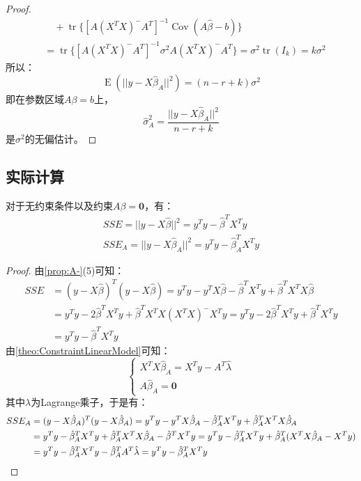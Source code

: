 \begin{proof}
\begin{align*}
		&\quad+\operatorname{tr}\{[A(X^TX)^-A^T]^{-1}\operatorname{Cov}(A\hat{\beta}-b)\} \\
		&=\operatorname{tr}\{[A(X^TX)^-A^T]^{-1}\sigma^2A(X^TX)^-A^T\}=\sigma^2\operatorname{tr}(I_k)=k\sigma^2
	\end{align*}
	所以：
	\begin{equation*}
		\operatorname{E}(||y-X\hat{\beta}_A||^2)=(n-r+k)\sigma^2
	\end{equation*}
	即在参数区域$A\beta=b$上，
	\begin{equation*}
		\hat{\sigma}_A^2=\frac{||y-X\hat{\beta}_A||^2}{n-r+k}
	\end{equation*}
	是$\sigma^2$的无偏估计。
\end{proof}

\subsection{实际计算}
\begin{theorem}
	对于无约束条件以及约束$A\beta=\mathbf{0}$，有：
	\begin{gather*}
		SSE=||y-X\hat{\beta}||^2=y^Ty-\hat{\beta}^TX^Ty \\
		SSE_A=||y-X\hat{\beta}_A||^2=y^Ty-\hat{\beta}_A^TX^Ty
	\end{gather*}
\end{theorem}
\begin{proof}
	由\cref{prop:A-}(5)可知：
	\begin{align*}
		SSE&=(y-X\hat{\beta})^T(y-X\hat{\beta})=y^Ty-y^TX\hat{\beta}-\hat{\beta}^TX^Ty+\hat{\beta}^TX^TX\hat{\beta} \\
		&=y^Ty-2\hat{\beta}^TX^Ty+\hat{\beta}^TX^TX(X^TX)^-X^Ty=y^Ty-2\hat{\beta}^TX^Ty+\hat{\beta}^TX^Ty \\
		&=y^Ty-\hat{\beta}^TX^Ty
	\end{align*}
	由\cref{theo:ConstraintLinearModel}可知：
	\begin{equation*}
		\begin{cases}
			X^TX\hat{\beta}_A=X^Ty-A^T\hat{\lambda} \\
			A\hat{\beta}_A=\mathbf{0}
		\end{cases}
	\end{equation*}
	其中$\lambda$为Lagrange乘子，于是有：
	\begin{align*}
		SSE_A&=(y-X\hat{\beta}_A)^T(y-X\hat{\beta}_A)=y^Ty-y^TX\hat{\beta}_A-\hat{\beta}_A^TX^Ty+\hat{\beta}_A^TX^TX\hat{\beta}_A \\
		&=y^Ty-\hat{\beta}_A^TX^Ty+\hat{\beta}_A^TX^TX\hat{\beta}_A-\hat{\beta}^TX^Ty=y^Ty-\hat{\beta}_A^TX^Ty+\hat{\beta}_A^T(X^TX\hat{\beta}_A-X^Ty) \\
		&=y^Ty-\hat{\beta}_A^TX^Ty-\hat{\beta}_A^TA^T\hat{\lambda}=y^Ty-\hat{\beta}_A^TX^Ty\qedhere
	\end{align*}
\end{proof}
